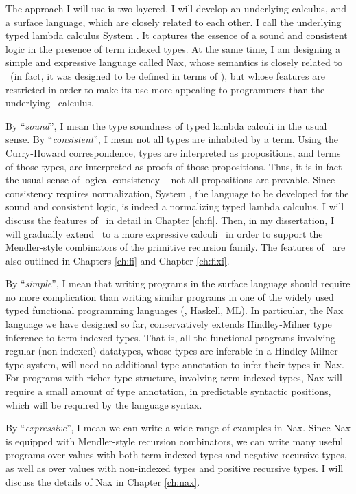 The approach I will use is two layered. I will develop an underlying calculus,
and a surface language, which are closely related to each other. I call the
underlying typed lambda calculus System \Fi. It captures the essence of a sound
and consistent logic in the presence of term indexed types. At the same time,
I am designing a simple and expressive language called Nax, whose semantics
is closely related to \Fi\ (in fact, it was designed to be defined in terms of \Fi), but whose
features are restricted in order to make its use more appealing to programmers
than the underlying \Fi\ calculus.

By ``\emph{sound}'', I mean the type soundness of typed lambda calculi
in the usual sense. By ``\emph{consistent}'', I mean not all types are
inhabited by a term. Using the Curry-Howard correspondence, types are
interpreted as propositions, and terms of those types, are interpreted as
proofs of those propositions. Thus, it is in fact the usual sense of
logical consistency -- not all propositions are provable. Since consistency
requires normalization, System \Fi, the language to be developed for the sound
and consistent logic, is indeed a normalizing typed lambda calculus. I will
discuss the features of \Fi\ in detail in Chapter \ref{ch:fi}. Then, in my
dissertation, I will gradually extend \Fi\ to a more expressive calculi \Fixi\
in order to support the Mendler-style combinators of the primitive recursion
family. The features of \Fixi\ are also outlined in Chapters \ref{ch:fi}
and Chapter \ref{ch:fixi}.

By ``\emph{simple}'', I mean that writing programs in the surface language
should require no more complication than writing similar programs in one of
the widely used typed functional programming languages (\eg, Haskell, ML).
In particular, the Nax language we have designed so far, conservatively
extends Hindley-Milner type inference to term indexed types. That is,
all the functional programs involving regular (non-indexed) datatypes, 
whose types are inferable in a Hindley-Milner type system, will need
no additional type annotation to infer their types in Nax. For programs
with richer type structure, involving term indexed types, Nax will require
a small amount of type annotation, in predictable syntactic positions,
which will be required by the language syntax.

By ``\emph{expressive}'', I mean we can write a wide range of examples in Nax.
Since Nax is equipped with Mendler-style recursion combinators, we can write
many useful programs over values with both term indexed types and
negative recursive types, as well as over values with non-indexed types and
positive recursive types. I will discuss the details of Nax
in Chapter \ref{ch:nax}.

